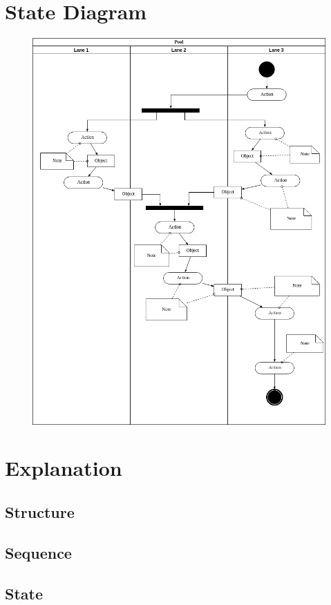 \documentclass[12p]{article}
\begin{document}
\section{State Diagram}
\begin{figure}[H]
  \includegraphics[width=1.0\textwidth]{State.png}
  \caption{} %
  \label{fig:state}
\end{figure}

\section{Explanation}
\subsection{Structure}
\subsection{Sequence}
\subsection{State}
\end{document}
